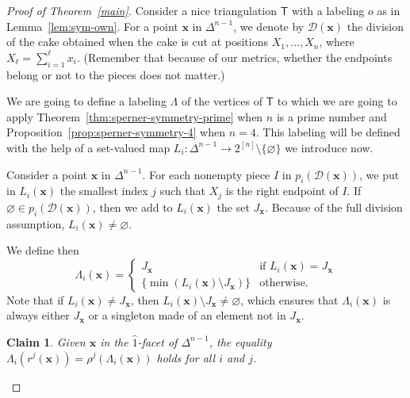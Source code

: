 \documentclass[12pt]{amsart}
\newtheorem*{claim}{Claim}
\theoremstyle{definition}
\theoremstyle{remark}
\def\D{\mathcal{D}}
\def\T{\mathsf{T}}
\def\xx{\boldsymbol{x}}
\begin{document}
\begin{proof}[Proof of Theorem~\ref{main}]
Consider a nice triangulation $\T$ with a labeling $o$ as in Lemma~\ref{lem:sym-own}. For a point $\xx$ in $\Delta^{n-1}$, we denote by $\D(\xx)$ the division of the cake obtained when the cake is cut at positions $X_1,\ldots,X_n$, where $X_{\ell}=\sum_{i=1}^{\ell}x_i$. (Remember that because of our metrics, whether the endpoints belong or not to the pieces does not matter.)

We are going to define a labeling $\Lambda$ of the vertices of $\T$ to which we are going to apply Theorem~\ref{thm:sperner-symmetry-prime} when $n$ is a prime number and Proposition~\ref{prop:sperner-symmetry-4} when $n=4$. This labeling will be defined with the help of a set-valued map $L_i\colon\Delta^{n-1}\rightarrow 2^{[n]}\setminus\{\varnothing\}$ we introduce now.

Consider a point $\xx$ in $\Delta^{n-1}$. For each nonempty piece $I$ in $p_{i}\left(\D(\xx)\right)$, we put in $L_i(\xx)$ the smallest index $j$ such that $X_j$ is the right endpoint of $I$. If $\varnothing\in p_{i}\left(\D(\xx)\right)$, then we add to $L_i(\xx)$ the set $J_{\xx}$. Because of the full division assumption, $L_i(\xx)\neq\varnothing$.

We define then 
$$\Lambda_i(\xx)=\left\{\begin{array}{ll} J_{\xx} & \mbox{if $L_i(\xx)=J_{\xx}$} \\ \{\min\left(L_i(\xx)\setminus J_{\xx}\right)\} & \mbox{otherwise.}\end{array}\right.$$
Note that if $L_i(\xx)\neq J_{\xx}$, then $L_i(\xx)\setminus J_{\xx}\neq\varnothing$, which ensures that $\Lambda_i(\xx)$ is always either $J_{\xx}$ or a singleton made of an element not in $J_{\xx}$.


\begin{claim}
Given $\xx$ in the $\widehat{1}$-facet of $\Delta^{n-1}$, the equality $\Lambda_i(r^j(\xx))=\rho^j\left(\Lambda_i(\xx)\right)$ holds for all $i$ and $j$.
\end{claim}


\end{proof}
\end{document}
